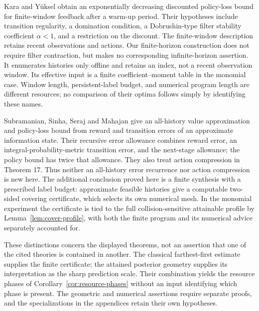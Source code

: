 \documentclass[11pt]{amsart}
\theoremstyle{definition}\newtheorem{definition}[theorem]{Definition}
\theoremstyle{remark}\newtheorem{remark}[theorem]{Remark}
\begin{document}
Kara and Y\"uksel \cite[Assumption 4 and Theorem 12]{KaraYuksel}
obtain an exponentially decreasing discounted policy-loss bound for
finite-window feedback after a warm-up period. Their hypotheses include
transition regularity, a domination condition, a Dobrushin-type filter
stability coefficient $\alpha<1$, and a restriction on the discount.
The finite-window description retains recent observations and actions.
Our finite-horizon construction does not require filter contraction,
but makes no corresponding infinite-horizon assertion. It enumerates
histories only offline and retains an index, not a recent observation
window. Its effective input is a finite coefficient--moment table in
the monomial case. Window length, persistent-label budget, and numerical
program length are different resources; no comparison of their optima
follows simply by identifying these names.

Subramanian, Sinha, Seraj and Mahajan
\cite[Definition 7 and Theorem 9]{Subramanian} give an all-history
value approximation and policy-loss bound from reward and transition
errors of an approximate information state. Their recursive error
allowance combines reward error, an integral-probability-metric transition
error, and the next-stage allowance; the policy bound has twice that
allowance. They also treat action compression in Theorem 17. Thus
neither an all-history error recurrence nor action compression is new
here. The additional conclusion proved here is a finite synthesis with
a prescribed label budget: approximate feasible histories give a
computable two-sided covering certificate, which selects its own
numerical mesh. In the monomial experiment the certificate is tied to
the full collision-sensitive attainable profile by
Lemma~\ref{lem:cover-profile}, with both the finite program and its
numerical advice separately accounted for.

These distinctions concern the displayed theorems, not an assertion that
one of the cited theories is contained in another. The classical
farthest-first estimate supplies the finite certificate; the attained
posterior geometry supplies its interpretation as the sharp prediction
scale. Their combination yields the resource phases of
Corollary~\ref{cor:resource-phases} without an input identifying which
phase is present. The geometric and numerical assertions require separate
proofs, and the specializations in the appendices retain their own
hypotheses.
\end{document}

